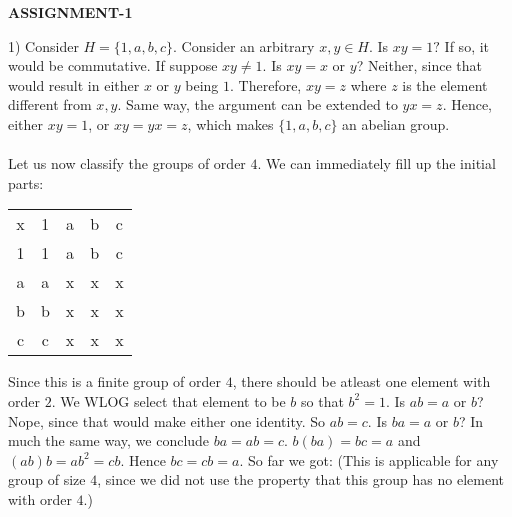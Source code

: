 \documentclass[../Main.tex]{subfiles}
\begin{document}
\begin{center}\textbf{ASSIGNMENT-1}\end{center}

1) Consider $H=\{1,a,b,c\}$. Consider an arbitrary $x,y \in H$. Is $xy=1?$ If so, it would be commutative. If suppose $xy \neq 1$. Is $xy=x$ or $y$? Neither, since that would result in either $x$ or $y$ being $1$. Therefore, $xy=z$ where $z$ is the element different from $x,y$. Same way, the argument can be extended to $yx=z$. Hence, either $xy=1$, or $xy=yx=z$, which makes $\{1,a,b,c \}$ an abelian group.
\\\\ Let us now classify the groups of order $4$. We can immediately fill up the initial parts:
\begin{center}

\begin{tabular}{ c c c c c }
x & 1 & a & b & c \\
1 & 1 & a & b & c \\
a & a & x & x & x \\
b & b & x & x & x \\
c & c & x & x & x \\
\end{tabular}
\end{center}
Since this is a finite group of order $4$, there should be atleast one element with order $2$. We WLOG select that element to be $b$ so that $b^2=1$. Is $ab=a$ or $b$? Nope, since that would make either one identity. So $ab=c$. Is $ba=a$ or $b$? In much the same way, we conclude $ba=ab=c$.
$b(ba)=bc=a$ and $(ab)b=ab^2=cb$. Hence $bc=cb=a$. So far we got: (This is applicable for any group of size $4$, since we did not use the property that this group has no element with order $4$.)
\end{document}

